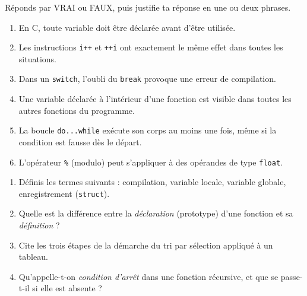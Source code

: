 \documentclass[11pt]{article}
\newcommand{\cle}[1]{{\popxbold\color{popdark}#1}}
\begin{document}
\begin{exercice}
Réponds par VRAI ou FAUX, puis justifie ta réponse en une ou deux phrases.
\begin{enumerate}
\item En C, toute variable doit être déclarée avant d'être utilisée.
\item Les instructions \texttt{i++} et \texttt{++i} ont exactement le même effet dans toutes les situations.
\item Dans un \texttt{switch}, l'oubli du \texttt{break} provoque une erreur de compilation.
\item Une variable déclarée à l'intérieur d'une fonction est visible dans toutes les autres fonctions du programme.
\item La boucle \texttt{do...while} exécute son corps au moins une fois, même si la condition est fausse dès le départ.
\item L'opérateur \texttt{\%} (modulo) peut s'appliquer à des opérandes de type \texttt{float}.
\end{enumerate}
\end{exercice}

\begin{exercice}
\begin{enumerate}
\item Définis les termes suivants : \cle{compilation}, \cle{variable locale}, \cle{variable globale}, \cle{enregistrement} (\texttt{struct}).
\item Quelle est la différence entre la \emph{déclaration} (prototype) d'une fonction et sa \emph{définition} ?
\item Cite les trois étapes de la démarche du tri par sélection appliqué à un tableau.
\item Qu'appelle-t-on \emph{condition d'arrêt} dans une fonction récursive, et que se passe-t-il si elle est absente ?
\end{enumerate}
\end{exercice}
\end{document}
